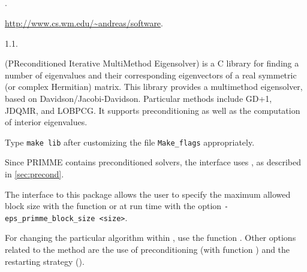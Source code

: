 \subsection*{\underline{\primme}}
	\begin{description}
	\setlength{\itemsep}{0pt}
	\item[References.]\citep{Stathopoulos:2010:PMS}.
	\item[Website.] \url{http://www.cs.wm.edu/~andreas/software}.
	\item[Version.] 1.1.
	\item[Summary.] \primme (PReconditioned Iterative MultiMethod Eigensolver) is a C library for finding a number of eigenvalues and their corresponding eigenvectors of a real symmetric (or complex Hermitian) matrix. This library provides a multimethod eigensolver, based on Davidson/Jacobi-Davidson. Particular methods include GD+1, JDQMR, and LOBPCG. It supports preconditioning as well as the computation of interior eigenvalues.
	\item[Installation.] Type \texttt{make lib} after customizing the file \texttt{Make\_flags} appropriately.
	\item[Specific options.] Since PRIMME contains preconditioned solvers, the \slepc interface uses , as described in \ref{sec:precond}.

The \slepc interface to this package allows the user to specify the maximum allowed block size with the function  or at run time with the option \Verb!-eps_primme_block_size <size>!.

For changing the particular algorithm within \primme, use the function . Other options related to the method are the use of preconditioning (with function ) and the restarting strategy ().
	\end{description}

